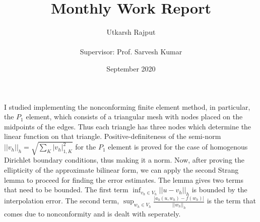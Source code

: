 \documentclass[12pt]{article}
\title{Monthly Work Report}
\date{September 2020}
\author{Utkarsh Rajput \\\\{Supervisor: Prof. Sarvesh Kumar}}
\begin{document}
	\maketitle
	I studied implementing the nonconforming finite element method, in particular, the $P_1$ element, which consists of a triangular mesh with nodes placed on the  midpoints of the edges. Thus each triangle has three nodes which determine the linear function on that triangle. Positive-definiteness of the semi-norm $||v_h||_h=\sqrt{\sum_{K}{|v_h|_{1,K}^{2}}} $ for the $P_1$ element is proved for the case of homogenous Dirichlet boundary conditions, thus making it a norm. Now, after proving the ellipticity of the approximate bilinear form, we can apply the second Strang lemma to proceed for finding the error estimates. The lemma gives two terms that need to be bounded. The first term $\inf_{v_h \in V_h} ||u-v_h||_h$ is bounded by the interpolation error. The second term, $\sup_{w_h \in V_h}\frac{|a_h(u,w_h)-f(w_h)|}{||w_h||_h}	$ is the term that comes due to nonconformity and is dealt with seperately.
\end{document}

